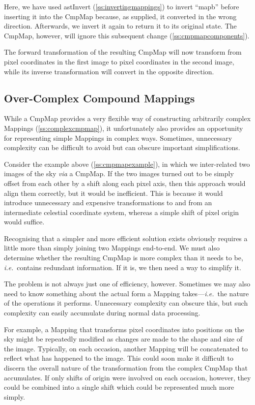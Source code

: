 \documentclass[twoside,11pt]{article}
\newcommand{\htmlref}[2]{#1}
\newcommand{\secref}[1]{\S\ref{#1}}
\renewcommand{\secref}[1]{\ref{#1}}
\begin{document}
Here, we have used \htmlref{astInvert}{astInvert} (\secref{ss:invertingmappings}) to invert
``mapb'' before inserting it into the CmpMap because, as supplied, it
converted in the wrong direction. Afterwards, we invert it again to
return it to its original state. The CmpMap, however, will ignore this
subsequent change (\secref{ss:cmpmapcomponents}).

The forward transformation of the resulting CmpMap will now transform
from pixel coordinates in the first image to pixel coordinates in the
second image, while its inverse transformation will convert in the
opposite direction.

\subsection{\label{ss:overcomplexcmpmaps}Over-Complex Compound Mappings}

While a \htmlref{CmpMap}{CmpMap} provides a very flexible way of constructing
arbitrarily complex Mappings (\secref{ss:complexcmpmap}), it
unfortunately also provides an opportunity for representing simple
Mappings in complex ways. Sometimes, unnecessary complexity can be
difficult to avoid but can obscure important simplifications.

Consider the example above (\secref{ss:cmpmapexample}), in which we
inter-related two images of the sky {\em{via}} a CmpMap.  If the two
images turned out to be simply offset from each other by a shift along
each pixel axis, then this approach would align them correctly, but it
would be inefficient. This is because it would introduce unnecessary
and expensive transformations to and from an intermediate celestial
coordinate system, whereas a simple shift of pixel origin would
suffice.

Recognising that a simpler and more efficient solution exists
obviously requires a little more than simply joining two Mappings
end-to-end. We must also determine whether the resulting CmpMap is
more complex than it needs to be, {\em{i.e.}}\ contains redundant
information. If it is, we then need a way to simplify it.

The problem is not always just one of efficiency, however. Sometimes
we may also need to know something about the actual form a \htmlref{Mapping}{Mapping}
takes---{\em{i.e.}}\ the nature of the operations it performs.
Unnecessary complexity can obscure this, but such complexity can
easily accumulate during normal data processing.

For example, a Mapping that transforms pixel coordinates into
positions on the sky might be repeatedly modified as changes are made
to the shape and size of the image. Typically, on each occasion,
another Mapping will be concatenated to reflect what has happened to
the image. This could soon make it difficult to discern the overall
nature of the transformation from the complex CmpMap that
accumulates. If only shifts of origin were involved on each occasion,
however, they could be combined into a single shift which could be
represented much more simply.
\end{document}
